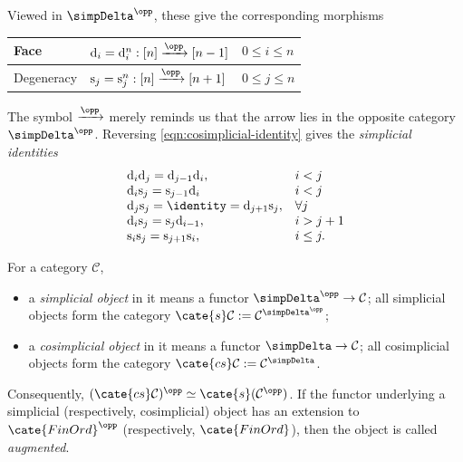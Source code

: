 Viewed in $\simpDelta^{\opp}$, these give the corresponding morphisms
\begin{center}\begin{tabular}{|l|l|l|} \hline
		Face & $\mathrm{d}_i = \mathrm{d}^n_i: [n] \xrightarrow{\opp} [n-1]$ & $0 \leq i \leq n$ \\ \hline
		Degeneracy & $\mathrm{s}_j = \mathrm{s}^n_j: [n] \xrightarrow{\opp} [n+1]$ & $0 \leq j \leq n$ \\ \hline
\end{tabular}\end{center}
The symbol $\xrightarrow{\opp}$ merely reminds us that the arrow lies in the
opposite category $\simpDelta^{\opp}$. Reversing
\eqref{eqn:cosimplicial-identity} gives the \emph{simplicial identities}
\begin{equation}\label{eqn:simplicial-identity}\begin{array}{ll}
	\mathrm{d}_i \mathrm{d}_j = \mathrm{d}_{j-1} \mathrm{d}_i, & i < j \\
	\mathrm{d}_i \mathrm{s}_j = \mathrm{s}_{j-1} \mathrm{d}_i & i < j \\
	\mathrm{d}_j \mathrm{s}_j = \identity = \mathrm{d}_{j+1} \mathrm{s}_j, & \forall j \\
	\mathrm{d}_i \mathrm{s}_j  = \mathrm{s}_j \mathrm{d}_{i-1}, & i > j+1 \\
	\mathrm{s}_i \mathrm{s}_j = \mathrm{s}_{j+1} \mathrm{s}_i, & i \leq j.
\end{array}\end{equation}

\begin{definition}\label{def:simplicial-obj}
	For a category $\mathcal{C}$,
	\begin{itemize}
		\item a \emph{simplicial object} in it means a functor
		$\simpDelta^{\opp}\to\mathcal{C}$; all simplicial objects form the
		category
		$\cate{s}\mathcal{C}:=\mathcal{C}^{\simpDelta^{\opp}}$;
		\item a \emph{cosimplicial object} in it means a functor
		$\simpDelta\to\mathcal{C}$; all cosimplicial objects form the category
		$\cate{cs}\mathcal{C}:=\mathcal{C}^{\simpDelta}$.
	\end{itemize}

	Consequently,
	$(\cate{cs}\mathcal{C})^{\opp}\simeq\cate{s}(\mathcal{C}^{\opp})$.
	If the functor underlying a simplicial (respectively, cosimplicial) object
	has an extension to $\cate{FinOrd}^{\opp}$ (respectively,
	$\cate{FinOrd}$), then the object is called \emph{augmented}.
\end{definition}

